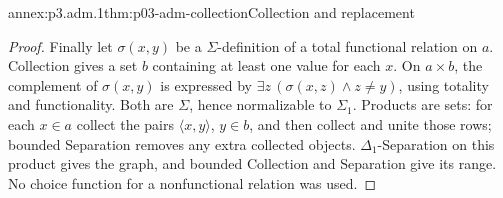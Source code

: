 \begin{annexitem}{annex:p3.adm.1}{thm:p03-adm-collection}{Collection and replacement}
\begin{proof}
Finally let \(\sigma(x,y)\) be a \(\Sigma\)-definition of a total
functional relation on \(a\). Collection gives a set \(b\) containing
at least one value for each \(x\). On \(a\times b\), the complement of
\(\sigma(x,y)\) is expressed by
\(\exists z\,(\sigma(x,z)\land z\ne y)\), using totality and
functionality. Both are \(\Sigma\), hence normalizable to
\(\Sigma_1\). Products are sets: for each \(x\in a\) collect the pairs
\(\langle x,y\rangle\), \(y\in b\), and then collect and unite those
rows; bounded Separation removes any extra collected objects.
\(\Delta_1\)-Separation on this product gives the graph, and bounded
Collection and Separation give its range. No choice function for a
nonfunctional relation was used.
\end{proof}
\end{annexitem}

